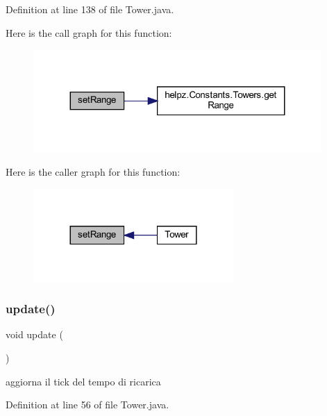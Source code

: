 Definition at line 138 of file Tower.\+java.

Here is the call graph for this function\+:\nopagebreak
\begin{figure}[H]
\begin{center}
\leavevmode
\includegraphics[width=311pt]{classtowers_1_1_tower_abfc55d980923d42001e5aefda77849f9_cgraph}
\end{center}
\end{figure}
Here is the caller graph for this function\+:\nopagebreak
\begin{figure}[H]
\begin{center}
\leavevmode
\includegraphics[width=216pt]{classtowers_1_1_tower_abfc55d980923d42001e5aefda77849f9_icgraph}
\end{center}
\end{figure}
\mbox{\label{classtowers_1_1_tower_ac5c54df7ed3b930268c8d7752c101725}} 
\subsubsection{\texorpdfstring{update()}{update()}}
{\footnotesize\ttfamily void update (\begin{DoxyParamCaption}{ }\end{DoxyParamCaption})}



aggiorna il tick del tempo di ricarica 



Definition at line 56 of file Tower.\+java.



